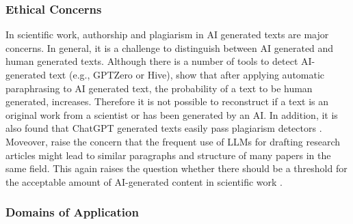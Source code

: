 \subsubsection{Ethical Concerns}


In scientific work, authorship and plagiarism in AI generated texts are major concerns. In general, it is a challenge to distinguish between AI generated and human generated texts. %
Although there is a number of tools to detect AI-generated text (e.g., GPTZero or Hive), \citet{anderson2023ai} show that after applying automatic paraphrasing to AI generated text, the probability of a text to be human generated, increases. %
Therefore it is not possible to reconstruct if a text is an original work from a scientist or has been generated by an AI. 
In addition, it is also found that ChatGPT generated texts easily pass plagiarism detectors \cite{else2023chatgpt,altmae2023artificial}. 
Moveover, \citet{macdonald2023can} raise the concern that the frequent use of LLMs for drafting research articles might lead to similar paragraphs and structure of many papers in the same field. This again raises the question whether there should be a threshold for the acceptable amount of AI-generated content in scientific work \cite{macdonald2023can}.


\subsubsection{Domains of Application}




